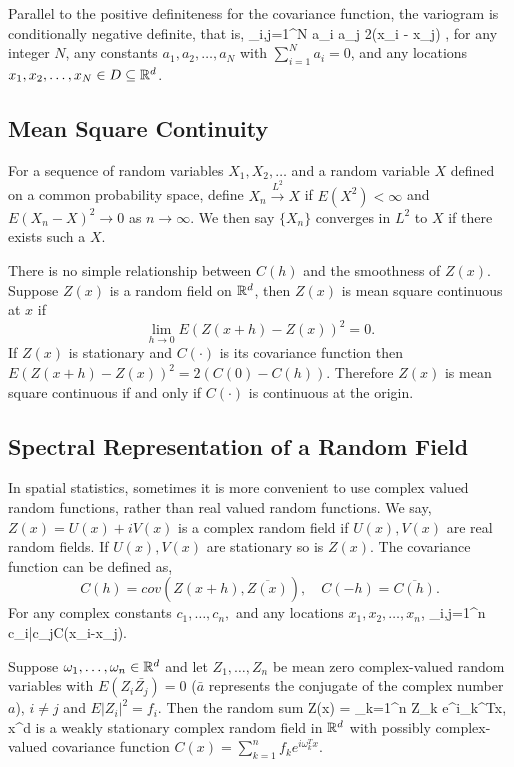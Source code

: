 Parallel to the positive definiteness for the covariance function, the variogram is conditionally negative definite, that is,
\beq
\sum_{i,j=1}^{N} a_i a_j 2\gamma(x_i - x_j) ,
\eeq
for any integer $N$, any constants $a_1, a_2, \ldots, a_N$ with $\sum_{i=1}^N a_i = 0$, and any locations $x_1, x_2, \ldots, x_N \in D \subseteq \mathbb{R}^d$.


\subsection{Mean Square Continuity}

For a sequence of random variables $X_1, X_2,\ldots$ and a random variable $X$ defined on a common probability space, define $X_n\overset{L^2}\to X$ if $E(X^2)<\infty$ and $E(X_n - X)^2\to 0$ as $n \rightarrow \infty$. We then say $\{X_n\}$ converges in $L^2$ to $X$ if there exists such a $X$.

There is no simple relationship between $C(h)$ and the smoothness of $Z(x)$. Suppose $Z(x)$ is a random field on $\mathbb{R}^d$, then $Z(x)$ is mean square continuous at $x$ if
\[
\lim_{h\to 0} E(Z(x+h)-Z(x))^2 =0.
\]
If $Z(x)$ is stationary and $C(\cdot)$ is its covariance function then $E(Z(x+h)-Z(x))^2=2(C(0)-C(h))$. Therefore $Z(x)$ is mean square continuous if and only if $C(\cdot)$ is continuous at the origin.

\subsection{Spectral Representation of a Random Field}
In spatial statistics, sometimes it is more convenient to use complex valued random functions, rather than real valued random functions. We say, $Z(x)=U(x) + i V(x)$ is a complex random field if $U(x),V(x)$ are real random fields. If $U(x),V(x)$ are stationary so is $Z(x)$. The covariance function can be defined as,
\[
	C(h) = cov(Z(x+h), \overline{Z(x)}), \quad C(-h)=\overline{C(h)}.
\]
For any complex constants $c_1,\ldots, c_n,$ and any locations $x_1, x_2, \ldots, x_n$,
\beq
\sum_{i,j=1}^n c_i\bar{c_j}C(x_i-x_j).
\eeq

Suppose $\omega_1,\ldots, \omega_n \in \mathbb{R}^d$ and let $Z_1, \ldots, Z_n$ be mean zero complex-valued random variables with  $E(Z_i\bar{Z_j})=0$  ($\bar{a}$ represents the conjugate of the complex number $a$), $i\ne j$ and  $E|Z_i|^2=f_i$. Then the random sum
\beq
Z(x) = \sum_{k=1}^n Z_k e^{i\omega_k^Tx}, \quad x\in\R^d
\eeq
is a weakly stationary complex random field in $\mathbb{R}^d$ with possibly complex-valued covariance function $C(x) = \sum_{k=1}^n f_k e^{i\omega_k^Tx}$. \\


